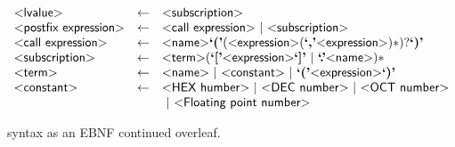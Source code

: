 \begin{figure}
\[\begin{array}{lcl}
  \pgrammar{lvalue} & \gets & \pgrammar{subscription}\\

  \pgrammar{postfix expression} & \gets & \pgrammar{call expression} ~|~ \pgrammar{subscription}\\

  \pgrammar{call expression} & \gets & \pgrammar{name} \plexer{(}
  (\pgrammar{expression} (\plexer{,} \pgrammar{expression})*)?
  \plexer{)}\\

  \pgrammar{subscription} & \gets & \pgrammar{term} (\plexer{[} \pgrammar{expression} \plexer{]} ~|~
                                                     \plexer{.} \pgrammar{name})*\\

  \pgrammar{term} & \gets & \pgrammar{name} ~|~ \pgrammar{constant} ~|~ \plexer{(} \pgrammar{expression} \plexer{)}\\

  \pgrammar{constant} & \gets & \pgrammar{HEX humber} ~|~ \pgrammar{DEC number} ~|~ \pgrammar{OCT number}\\&&
  ~|~ \pgrammar{Floating point number}\\
\end{array}
\]
  \caption {\pencil{} syntax as an EBNF continued overleaf.}
\end{figure}
